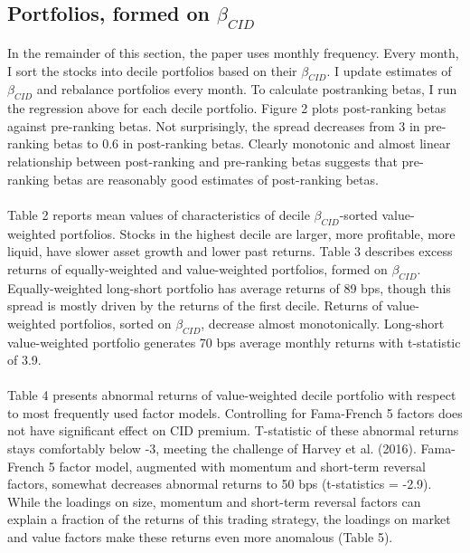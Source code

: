 \documentclass[12pt]{article}
\begin{document}
\subsection{Portfolios, formed on $\beta_{CID}$}

In the remainder of this section, the paper uses monthly frequency. Every month, I sort the stocks into decile portfolios based on their $\beta_{CID}$. I update estimates of $\beta_{CID}$ and rebalance portfolios every month. To calculate postranking betas, I run the  regression above for each decile portfolio. Figure 2 plots post-ranking betas against pre-ranking betas. Not surprisingly, the spread decreases from 3 in pre-ranking betas to 0.6 in post-ranking betas. Clearly monotonic and almost linear relationship between post-ranking and pre-ranking betas suggests that pre-ranking betas are reasonably good estimates of post-ranking betas. 
\paragraph{}
Table 2 reports mean values of characteristics of decile $\beta_{CID}$-sorted value-weighted portfolios. Stocks in the highest decile are larger, more profitable, more liquid, have slower asset growth and lower past returns. Table 3 describes excess returns of equally-weighted and value-weighted portfolios, formed on $\beta_{CID}$. Equally-weighted long-short portfolio has average returns of 89 bps, though this spread is mostly driven by the returns of the first decile. Returns of value-weighted portfolios, sorted on $\beta_{CID}$, decrease almost monotonically. Long-short value-weighted portfolio generates 70 bps average monthly returns with t-statistic of 3.9. 
\paragraph{}
Table 4 presents abnormal returns of value-weighted decile portfolio with respect to most frequently used factor models. Controlling for Fama-French 5 factors does not have significant effect on CID premium. T-statistic of these abnormal returns stays comfortably below -3, meeting the challenge of Harvey et al. (2016). Fama-French 5 factor model, augmented with momentum and short-term reversal factors, somewhat decreases abnormal returns to 50 bps (t-statistics = -2.9). While the loadings on size, momentum and short-term reversal factors can explain a fraction of the returns of this trading strategy, the loadings on market and value factors make these returns even more anomalous (Table 5).
\end{document}

